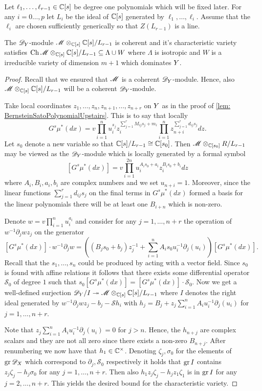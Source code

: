Let $\ell_1,\ldots,\ell_{r-1}\in \mathbb{C}[s]$ be degree one polynomials which will be fixed later.
For any $i=0\ldots,p$ let $L_i$ be the ideal of $\mathbb{C}[s]$ generated by $\ell_1,\ldots,\ell_i$.
Assume that the $\ell_i$ are chosen sufficiently generically so that $Z(L_{r-1})$ is a line.
\begin{lemma}\label{lem: CharVarEstimateW}
  The $\mathscr{D}_Y$-module $\mathscr{M}\otimes_{\mathbb{C}[s]}\mathbb{C}[s]/L_{r-1}$ is coherent and it's characteristic variety satisfies $\operatorname{Ch}\mathscr{M}\otimes_{\mathbb{C}[s]}\mathbb{C}[s]/L_{r-1} \subseteq \Lambda \cup W $ where $\Lambda$ is isotropic and $W$ is a irreducible variety of dimension $m +1$ which dominates $Y$.
\end{lemma}
\begin{proof}
  Recall that we ensured that $\mathscr{M}$ is a coherent $\mathscr{D}_Y$-module.
  Hence, also $\mathscr{M}\otimes_{\mathbb{C}[s]}\mathbb{C}[s]/L_{r-1}$ will be a coherent $\mathscr{D}_Y$-module.

  Take local coordinates $z_1,\ldots,z_n,z_{n+1},\ldots,z_{n+r}$ on $Y$ as in the proof of \cref{lem: BernsteinSatoPolynomialUpstairs}.
  This is to say that locally
  $$G^s \mu^*(dx) = v \prod_{i=1}^nu_i^{s_j}z_i^{\sum_{j=1}^r M_{ij}s_j + m_i}\prod_{i=1}^n z_{n+i}^{\sum_{j=1}^r d_{ij}s_j} dz.$$
  Let $s_0$ denote a new variable so that $\mathbb{C}[s]/L_{r-1}\cong \mathbb{C}[s_0]$.
  Then $\mathscr{M}\otimes_{\mathbb{C}[s_0]}R/L_{r-1}$ may be viewed as the $\mathscr{D}_Y$-module which is locally generated by a formal symbol
  $$[G^s \mu^*(dx)] =v \prod_{i=1}^{2n} u_i^{A_i s_0 + a_i}z_i^{B_i s_0 + b_i} dz $$
  where $A_i,B_i,a_i,b_i$ are complex numbers and we set $u_{n+i}=1$.
  Moreover, since the linear functions $\sum_{j=1}^r d_{ij}s_j$ on the final terms in $G^s\mu^*(dx)$ formed a basis for the linear polynomials there will be at least one $B_{i+n}$ which is non-zero.

  Denote $w = v\prod_{i=1}^n u_i^{a_i}$ and consider for any $j=1,\ldots,n+r$ the operation of $w^{-1}\partial_j wz_j$ on the generator
  $$[G^s \mu^*(dx)]\cdot w^{-1}\partial_j w =((B_j s_0 + b_j)z_j^{-1} + \sum_{i=1}^{n} A_i s_0 u_i^{-1}\partial_j(u_i) )[G^s \mu^*(dx)].$$
  Recall that the $s_1,\ldots,s_n$ could be produced by acting with a vector field.
  Since $s_0$ is found with affine relations it follows that there exists some differential operator $\mathcal{S}_0$ of degree $1$ such that $s_0 [G^s \mu^*(dx)] = [G^s \mu^*(dx)]\cdot \mathcal{S}_0$.
  Now we get a well-defined surjection $\mathscr{D}_Y/I \twoheadrightarrow \mathscr{M}\otimes_{\mathbb{C}[s]}\mathbb{C}[s]/L_{r-1}$ where $I$ denotes the right ideal generated by $w^{-1}\partial_j wz_j - b_j - \mathcal{S} h_i$ with $h_j = B_j + z_j\sum_{i=1}^n A_iu_i^{-1}\partial_j(u_i)$ for $j=1,\ldots, n+r$.

  Note that $ z_j\sum_{i=1}^n A_iu_i^{-1}\partial_j(u_i) = 0$ for $j>n$.
  Hence, the $h_{n+j}$ are complex scalars and they are not all zero since there exists a non-zero $B_{n+j}$.
  After renumbering we now have that $h_1 \in \mathbb{C}^\times$.
  Denoting $\zeta_j, \sigma_0$ for the elements of $\operatorname{gr} \mathscr{D}_X$ which correspond to $\partial_j, \mathcal{S}_0$ respectively it holds that $\operatorname{gr} I$ contains $z_j \zeta_j - h_j \sigma_0$ for any $j=1,\ldots, n+r$.
  Then also $h_1z_j \zeta_j - h_jz_1 \zeta_1$ is in $\operatorname{gr} I$ for any $j=2,\ldots, n+r$.
  This yields the desired bound for the characteristic variety.
\end{proof}
